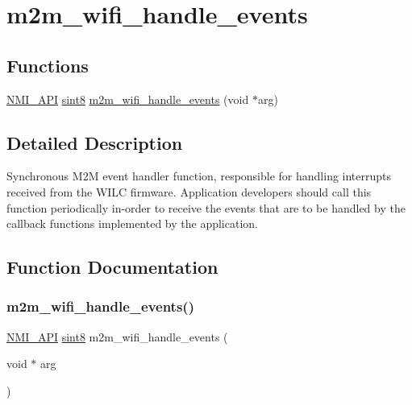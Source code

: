 \hypertarget{group__WifiHandleEventsFn}{}\section{m2m\+\_\+wifi\+\_\+handle\+\_\+events}
\label{group__WifiHandleEventsFn}
\subsection*{Functions}
\begin{DoxyCompactItemize}
\item 
\hyperlink{group__BSPDefine_gaecc0323d771e41ef81a76b5f12783e22}{N\+M\+I\+\_\+\+A\+PI} \hyperlink{group__DataT_gae35f10ffd0ac8dd2bc3e794da9bdfbc7}{sint8} \hyperlink{group__WifiHandleEventsFn_ga461a4edc057cec8c00cf124a07aa3b02}{m2m\+\_\+wifi\+\_\+handle\+\_\+events} (void $\ast$arg)
\end{DoxyCompactItemize}


\subsection{Detailed Description}
Synchronous M2M event handler function, responsible for handling interrupts received from the W\+I\+LC firmware. Application developers should call this function periodically in-\/order to receive the events that are to be handled by the callback functions implemented by the application. 

\subsection{Function Documentation}
\mbox{\label{group__WifiHandleEventsFn_ga461a4edc057cec8c00cf124a07aa3b02}} 
\subsubsection{\texorpdfstring{m2m\+\_\+wifi\+\_\+handle\+\_\+events()}{m2m\_wifi\_handle\_events()}}
{\footnotesize\ttfamily \hyperlink{group__BSPDefine_gaecc0323d771e41ef81a76b5f12783e22}{N\+M\+I\+\_\+\+A\+PI} \hyperlink{group__DataT_gae35f10ffd0ac8dd2bc3e794da9bdfbc7}{sint8} m2m\+\_\+wifi\+\_\+handle\+\_\+events (\begin{DoxyParamCaption}\item[{void $\ast$}]{arg }\end{DoxyParamCaption})}



